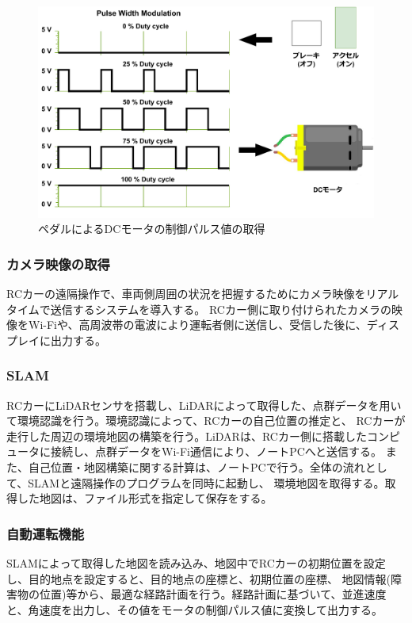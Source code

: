 \begin{figure}[h]
  \begin{center}
    \includegraphics[width=.75\linewidth]{img/auto_4.pdf}
    \caption{ペダルによるDCモータの制御パルス値の取得}
    \label{auto:dcpwm}
  \end{center}
\end{figure}


\subsubsection{カメラ映像の取得}
RCカーの遠隔操作で、車両側周囲の状況を把握するためにカメラ映像をリアルタイムで送信するシステムを導入する。
RCカー側に取り付けられたカメラの映像をWi-Fiや、高周波帯の電波により運転者側に送信し、受信した後に、ディスプレイに出力する。

\subsubsection{SLAM}
RCカーにLiDARセンサを搭載し、LiDARによって取得した、点群データを用いて環境認識を行う。環境認識によって、RCカーの自己位置の推定と、
RCカーが走行した周辺の環境地図の構築を行う。LiDARは、RCカー側に搭載したコンピュータに接続し、点群データをWi-Fi通信により、ノートPCへと送信する。
また、自己位置・地図構築に関する計算は、ノートPCで行う。全体の流れとして、SLAMと遠隔操作のプログラムを同時に起動し、
環境地図を取得する。取得した地図は、ファイル形式を指定して保存をする。

\subsubsection{自動運転機能}
SLAMによって取得した地図を読み込み、地図中でRCカーの初期位置を設定し、目的地点を設定すると、目的地点の座標と、初期位置の座標、
地図情報(障害物の位置)等から、最適な経路計画を行う。経路計画に基づいて、並進速度と、角速度を出力し、その値をモータの制御パルス値に変換して出力する。

